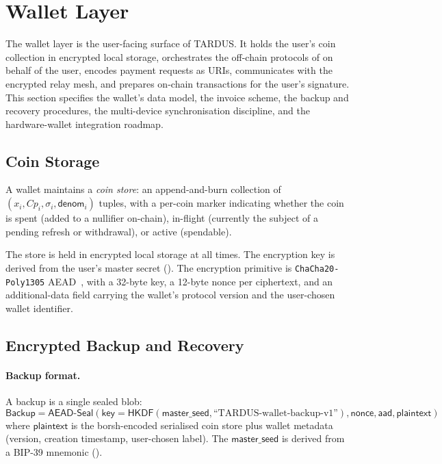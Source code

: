 \section{Wallet Layer}
\label{sec:wallet}

The wallet layer is the user-facing surface of TARDUS. It holds the user's coin collection in encrypted local storage, orchestrates the off-chain protocols of  on behalf of the user, encodes payment requests as URIs, communicates with the encrypted relay mesh, and prepares on-chain transactions for the user's signature. This section specifies the wallet's data model, the invoice scheme, the backup and recovery procedures, the multi-device synchronisation discipline, and the hardware-wallet integration roadmap.

\subsection{Coin Storage}
\label{sec:wallet-coin-storage}

A wallet maintains a \emph{coin store}: an append-and-burn collection of $(x_i, Cp_i, \sigma_i, \mathsf{denom}_i)$ tuples, with a per-coin marker indicating whether the coin is spent (added to a nullifier on-chain), in-flight (currently the subject of a pending refresh or withdrawal), or active (spendable).

The store is held in encrypted local storage at all times. The encryption key is derived from the user's master secret (). The encryption primitive is \texttt{ChaCha20-Poly1305} AEAD~\cite{nist-sp800-185}, with a 32-byte key, a 12-byte nonce per ciphertext, and an additional-data field carrying the wallet's protocol version and the user-chosen wallet identifier.

\subsection{Encrypted Backup and Recovery}
\label{sec:wallet-backup}

\paragraph{Backup format.} A backup is a single sealed blob:
\[
  \mathsf{Backup} = \mathsf{AEAD\text{-}Seal}(\mathsf{key} = \mathsf{HKDF}(\mathsf{master\_seed}, \text{``TARDUS-wallet-backup-v1''}), \mathsf{nonce}, \mathsf{aad}, \mathsf{plaintext})
\]
where $\mathsf{plaintext}$ is the borsh-encoded serialised coin store plus wallet metadata (version, creation timestamp, user-chosen label). The $\mathsf{master\_seed}$ is derived from a BIP-39 mnemonic ().

